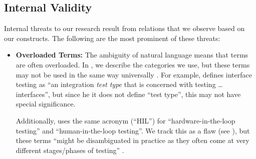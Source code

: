 \clearpage
\subsection{Internal Validity}\label{inter-valid}
Internal threats to our research result from relations that we observe based on
our constructs. The following are the most prominent of these threats:

\begin{itemize}
    \item \textbf{Overloaded Terms:} The ambiguity of natural language means
          that terms are often overloaded. In , we describe
          the categories we use, but these terms may not be used in the same
          way universally%
          . For example, \citet[p.~45\ifnotpaper, emphasis added\fi]{Kam2008}
          defines interface testing as ``an integration \emph{test type} that
          is concerned with testing \dots{} interfaces'', but since \ifnotpaper
              he \else it \fi does not define ``test type'', this may not have
          special significance.

          Additionally, \citet[p.~23]{Firesmith2015} uses the same acronym
          (``HIL'') for ``hardware-in-the-loop testing'' and
          ``human-in-the-loop testing''. We track this as a flaw (see
          ), but these terms ``might be disambiguated in
          practice as they often come at very different stages/phases of
          testing'' %
          \PaigeMtgNote. %


\end{itemize}
